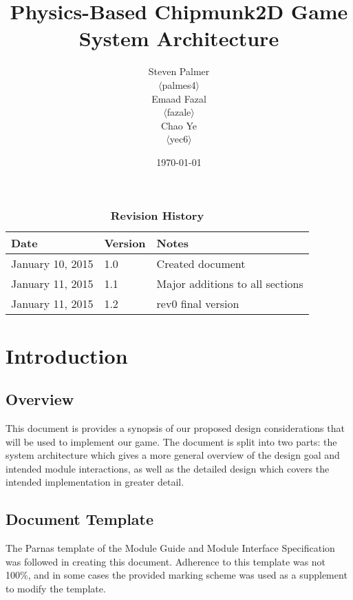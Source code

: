 \documentclass[12pt, titlepage]{article}
\begin{document}
\title{\bf Physics-Based Chipmunk2D Game\\[\baselineskip]\Large System Architecture}
\author{Steven Palmer\\$\langle$palmes4$\rangle$\\Emaad Fazal\\$\langle$fazale$\rangle$\\Chao Ye\\$\langle$yec6$\rangle$}
\date{\today}
	
\maketitle

\tableofcontents
\listoftables
\listoffigures


\begin{table}[hTB]
\caption*{\bf Revision History}
\begin{tabularx}{\textwidth}{p{3.5cm}p{2cm}X}
\toprule {\bf Date} & {\bf Version} & {\bf Notes}\\
\midrule
January 10, 2015 & 1.0 & Created document\\
January 11, 2015 & 1.1 & Major additions to all sections\\
January 11, 2015 & 1.2 & rev0 final version\\
\bottomrule
\end{tabularx}
\end{table}

\newpage


\section{Introduction}
\subsection{Overview}
This document is provides a synopsis of our proposed design considerations that will be used to implement our game.  The document is split into two parts:  the system architecture which gives a more general overview of the design goal and intended module interactions, as well as the detailed design which covers the intended implementation in greater detail.



\subsection{Document Template}
The Parnas template of the Module Guide and Module Interface Specification was followed in creating this document.  Adherence to this template was not 100\%, and in some cases the provided marking scheme was used as a supplement to modify the template.
\end{document}

